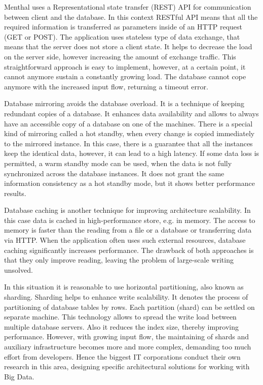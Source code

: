 Menthal uses a Representational state transfer (REST) API for communication between client and the database.
In this context RESTful API means that all the required information is transferred as parameters inside of an HTTP request (GET or POST).
The application uses stateless type of data exchange, that means that the server does not store a client state.
It helps to decrease the load on the server side, however increasing the amount of exchange traffic.
This straightforward approach is easy to implement, however, at a certain point, it cannot anymore sustain a constantly growing load.
The database cannot cope anymore with the increased input flow, returning a timeout error.

Database mirroring avoids the database overload.
It is a technique of keeping redundant copies of a database.
It enhances data availability and allows to always have an accessible copy of a database on one of the machines.
There is a special kind of mirroring called a hot standby, when every change is copied immediately to the mirrored instance.
In this case, there is a guarantee that all the instances keep the identical data, however, it can lead to a high latency.
If some data loss is permitted, a warm standby mode can be used, when the data is not fully synchronized across the database instances.
It does not grant the same information consistency as a hot standby mode, but it shows better performance results.

Database caching is another technique for improving architecture scalability. 
In this case data is cached in high-performance store, e.g. in memory.
The access to memory is faster than the reading from a file or a database or transferring data via HTTP.
When the application often uses such external resources, database caching significantly increases performance. 
The drawback of both approaches is that they only improve reading, leaving the problem of large-scale writing unsolved. 

In this situation it is reasonable to use horizontal partitioning, also known as sharding.
Sharding helps to enhance write scalability.
It denotes the process of partitioning of database tables by rows.
Each partition (shard) can be settled on separate machine.
This technology allows to spread the write load between multiple database servers.
Also it reduces the index size, thereby improving performance.
However, with growing input flow, the maintaining of shards and auxiliary infrastructure becomes more and more complex, demanding too much effort from developers. 	   
Hence the biggest IT corporations conduct their own research in this area, designing specific architectural solutions for working with Big Data.